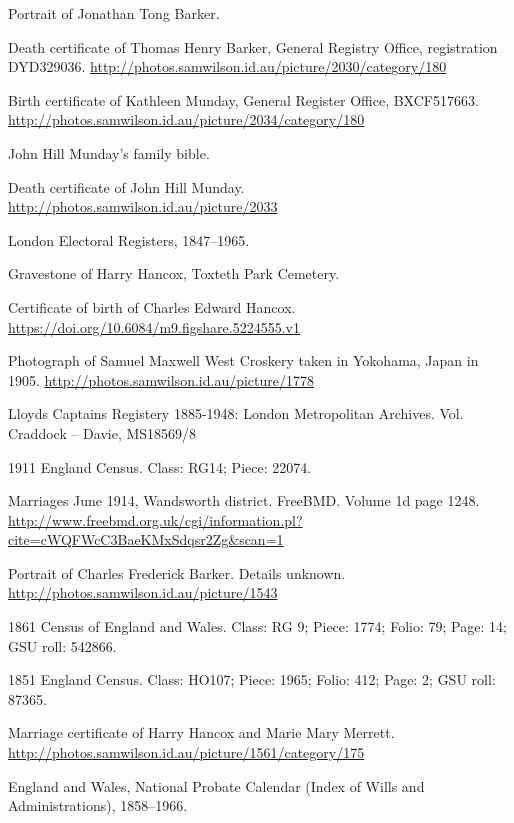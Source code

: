 \begin{thebibliography}{99}
	Portrait of Jonathan Tong Barker. \url{}

	Death certificate of Thomas Henry Barker, General Registry Office, registration DYD329036.
	\url{http://photos.samwilson.id.au/picture/2030/category/180}

	Birth certificate of Kathleen Munday, General Register Office, BXCF517663.
	\url{http://photos.samwilson.id.au/picture/2034/category/180}

	John Hill Munday's family bible.

	Death certificate of John Hill Munday.
	\url{http://photos.samwilson.id.au/picture/2033}

	London Electoral Registers, 1847--1965.

	Gravestone of Harry Hancox, Toxteth Park Cemetery.

	Certificate of birth of Charles Edward Hancox.
	\url{https://doi.org/10.6084/m9.figshare.5224555.v1}

	Photograph of Samuel Maxwell West Croskery taken in Yokohama, Japan in 1905.
	\url{http://photos.samwilson.id.au/picture/1778}

	Lloyds Captains Registery 1885-1948: London Metropolitan Archives. Vol. Craddock -- Davie, MS18569/8

	1911 England Census. Class: RG14; Piece: 22074.

	Marriages June 1914, Wandsworth district. FreeBMD. Volume 1d page 1248.
	\url{http://www.freebmd.org.uk/cgi/information.pl?cite=cWQFWcC3BaeKMxSdqsr2Zg&scan=1}

	Portrait of Charles Frederick Barker. Details unknown.
	\url{http://photos.samwilson.id.au/picture/1543}

	1861 Census of England and Wales.
	Class: RG 9; Piece: 1774; Folio: 79; Page: 14; GSU roll: 542866.

	1851 England Census.
	Class: HO107; Piece: 1965; Folio: 412; Page: 2; GSU roll: 87365.

	Marriage certificate of Harry Hancox and Marie Mary Merrett.
	\url{http://photos.samwilson.id.au/picture/1561/category/175}

	England and Wales, National Probate Calendar (Index of Wills and Administrations), 1858--1966.


\end{thebibliography}
